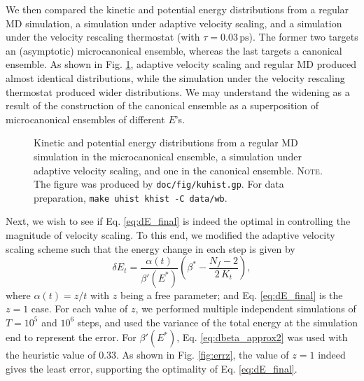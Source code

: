 \documentclass[reprint]{revtex4-1}
\newcommand{\note}[1]{{\color{DarkGreen}\footnotesize \textsc{Note.} #1}}
\begin{document}
We then compared the kinetic and potential energy
distributions from a regular MD simulation,
a simulation under adaptive velocity scaling,
and
a simulation under the velocity rescaling thermostat\cite{bussi2007}
(with $\tau = 0.03 \, \mathrm{ps}$).
%
The former two targets an (asymptotic) microcanonical ensemble,
whereas the last targets a canonical ensemble.
%
As shown in Fig. \ref{fig:kuhist},
adaptive velocity scaling and regular MD
produced almost identical distributions,
while the simulation under the velocity rescaling thermostat
produced wider distributions.
%
We may understand the widening %
as a result of the construction of the canonical ensemble
as a superposition of microcanonical ensembles of different $E$'s.
%
%

\begin{figure}[h]
\begin{center}
  \caption{
    \label{fig:kuhist}
    Kinetic and potential energy distributions
    from a regular MD simulation in the microcanonical ensemble,
    a simulation under adaptive velocity scaling,
    and one in the canonical ensemble.
    \note{The figure was produced by \texttt{doc/fig/kuhist.gp}.
      For data preparation, \texttt{make uhist khist -C data/wb}.
    }%
  }
\end{center}
\end{figure}


Next, we wish to see if Eq. \eqref{eq:dE_final}
is indeed the optimal in controlling the magnitude of velocity scaling.
%
To this end, we modified the adaptive velocity scaling scheme
such that the energy change in each step is given by
%
\begin{equation}
  \delta E_t
  =
  \frac{ \alpha(t) } { \beta'(E^*) }
  \left(
   \beta^* -
   \frac{ N_f - 2 }
   { 2 \, K_t }
  \right)
  ,
  \label{eq:dE_mod}
\end{equation}
%
where $\alpha(t) = z/t$ with $z$ being a free parameter;
and Eq. \eqref{eq:dE_final} is the $z = 1$ case.
%
For each value of $z$,
we performed multiple independent simulations of
$T = 10^5$ and $10^6$ steps,
and used the variance of the total energy at the simulation end
to represent the error.
%
For $\beta'(E^*)$,
Eq. \eqref{eq:dbeta_approx2} was used with the heuristic value of $0.33$.
%
As shown in Fig. \ref{fig:errz},
the value of $z = 1$
indeed gives the least error,
supporting the optimality of Eq. \eqref{eq:dE_final}.
\end{document}
